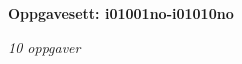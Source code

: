 \centerline{\bf Oppgavesett: i01001no-i01010no}
\vskip 10pt
\centerline{\it 10 oppgaver}\vskip 10pt
\vskip 10pt

